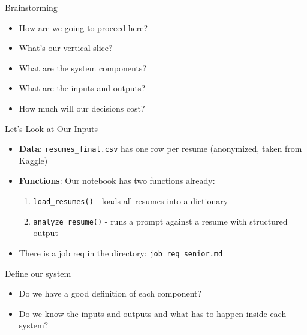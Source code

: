 \documentclass[aspectratio=169]{beamer}
\begin{document}
\begin{frame}{Brainstorming}
\begin{itemize}
\item How are we going to proceed here?
\item What's our vertical slice?
\item What are the system components?
\item What are the inputs and outputs?
\item How much will our decisions cost?
\end{itemize}
\end{frame}

\begin{frame}{Let's Look at Our Inputs}
\begin{itemize}
	\item \textbf{Data}: \texttt{resumes\_final.csv} has one row per resume (anonymized, taken from Kaggle)
	\item \textbf{Functions}: Our notebook has two functions already:
	\begin{enumerate}
		\item \texttt{load\_resumes()} - loads all resumes into a dictionary
		\item \texttt{analyze\_resume()} - runs a prompt against a resume with structured output
	\end{enumerate}
	\item There is a job req in the directory: \texttt{job\_req\_senior.md}
\end{itemize}
\end{frame}

\begin{frame}{Define our system}
\begin{itemize}
\item Do we have a good definition of each component?
\item Do we know the inputs and outputs and what has to happen inside each system?
\end{itemize}
\vspace{0.5cm}

\begin{center}
\end{center}
\end{frame}
\end{document}
